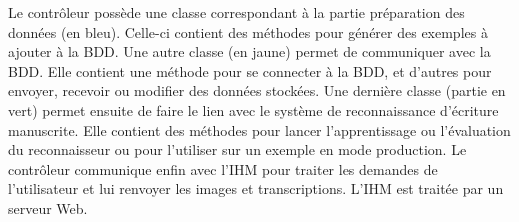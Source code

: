 Le contrôleur possède une classe correspondant à la partie préparation des données (en bleu). Celle-ci contient des méthodes pour générer des exemples à ajouter à la BDD. Une autre classe (en jaune) permet de communiquer avec la BDD. Elle contient une méthode pour se connecter à la BDD, et d’autres pour envoyer, recevoir ou modifier des données stockées. Une dernière classe (partie en vert) permet ensuite de faire le lien avec le système de reconnaissance d’écriture manuscrite. Elle contient des méthodes pour lancer l’apprentissage ou l’évaluation du reconnaisseur ou pour l’utiliser sur un exemple en mode production.
Le contrôleur communique enfin avec l’IHM pour traiter les demandes de l’utilisateur et lui renvoyer les images et transcriptions. L’IHM est traitée par un serveur Web.

